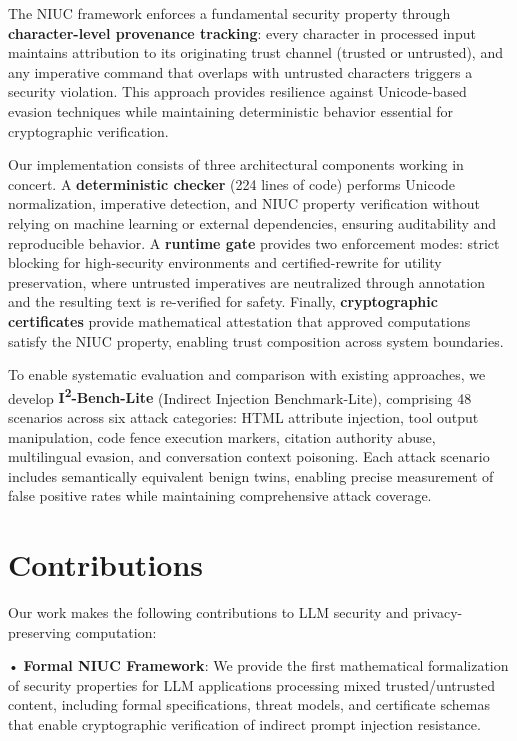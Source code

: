The NIUC framework enforces a fundamental security property through \textbf{character-level provenance tracking}: every character in processed input maintains attribution to its originating trust channel (trusted or untrusted), and any imperative command that overlaps with untrusted characters triggers a security violation. This approach provides resilience against Unicode-based evasion techniques while maintaining deterministic behavior essential for cryptographic verification.

Our implementation consists of three architectural components working in concert. A \textbf{deterministic checker} (224 lines of code) performs Unicode normalization, imperative detection, and NIUC property verification without relying on machine learning or external dependencies, ensuring auditability and reproducible behavior. A \textbf{runtime gate} provides two enforcement modes: strict blocking for high-security environments and certified-rewrite for utility preservation, where untrusted imperatives are neutralized through annotation and the resulting text is re-verified for safety. Finally, \textbf{cryptographic certificates} provide mathematical attestation that approved computations satisfy the NIUC property, enabling trust composition across system boundaries.

To enable systematic evaluation and comparison with existing approaches, we develop \textbf{I\textsuperscript{2}-Bench-Lite} (Indirect Injection Benchmark-Lite), comprising 48 scenarios across six attack categories: HTML attribute injection, tool output manipulation, code fence execution markers, citation authority abuse, multilingual evasion, and conversation context poisoning. Each attack scenario includes semantically equivalent benign twins, enabling precise measurement of false positive rates while maintaining comprehensive attack coverage.

\section{Contributions}

Our work makes the following contributions to LLM security and privacy-preserving computation:

• \textbf{Formal NIUC Framework}: We provide the first mathematical formalization of security properties for LLM applications processing mixed trusted/untrusted content, including formal specifications, threat models, and certificate schemas that enable cryptographic verification of indirect prompt injection resistance.

